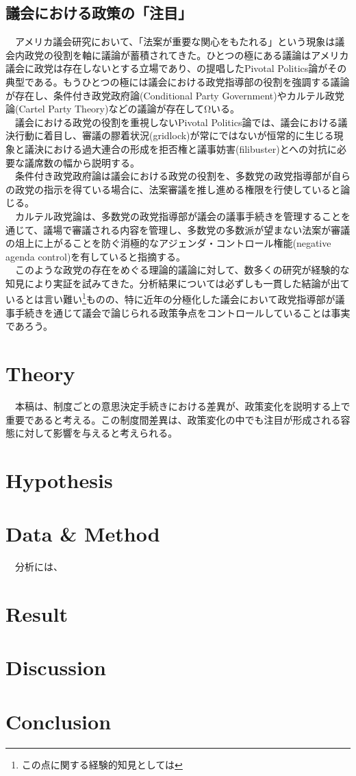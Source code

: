 \subsection{議会における政策の「注目」}
　アメリカ議会研究において、「法案が重要な関心をもたれる」という現象は議会内政党の役割を軸に議論が蓄積されてきた。ひとつの極にある議論はアメリカ議会に政党は存在しないとする立場であり、\citet*{Krehbiel2010-ob}の提唱したPivotal Politics論がその典型である。もうひとつの極には議会における政党指導部の役割を強調する議論が存在し、条件付き政党政府論(Conditional Party Government)\citep*{Rohde1991-da, Aldrich1995-xf}やカルテル政党論(Cartel Party Theory)\citep*{Cox2005-pn,Cox2007-xq}などの議論が存在してΩいる。\\
　議会における政党の役割を重視しないPivotal Politics論では、議会における議決行動に着目し、審議の膠着状況(gridlock)が常にではないが恒常的に生じる現象と議決における過大連合の形成を拒否権と議事妨害(filibuster)とへの対抗に必要な議席数の幅から説明する。\citep*{Krehbiel2010-ob}\\
　条件付き政党政府論は議会における政党の役割を、多数党の政党指導部が自らの政党の指示を得ている場合に、法案審議を推し進める権限を行使していると論じる。\\
　カルテル政党論は、多数党の政党指導部が議会の議事手続きを管理することを通じて、議場で審議される内容を管理し、多数党の多数派が望まない法案が審議の俎上に上がることを防ぐ消極的なアジェンダ・コントロール権能(negative agenda control)を有していると指摘する。\citep*{Cox2005-pn}\\
　このような政党の存在をめぐる理論的議論に対して、数多くの研究が経験的な知見により実証を試みてきた。分析結果については必ずしも一貫した結論が出ているとは言い難い\footnote{この点に関する経験的知見としては}ものの、特に近年の分極化した議会において政党指導部が議事手続きを通じて議会で論じられる政策争点をコントロールしていることは事実であろう。\citep*{Sinclair1997-jm, Sinclair2016-kh,Rosenthal2008-xb, Peters2010-ve}\\

\section*{Theory}
　本稿は、制度ごとの意思決定手続きにおける差異が、政策変化を説明する上で重要であると考える。この制度間差異は、政策変化の中でも注目が形成される容態に対して影響を与えると考えられる。
　

\section*{Hypothesis}

\section*{Data \& Method}
　分析には、

\section*{Result}

\section*{Discussion}

\section*{Conclusion}
